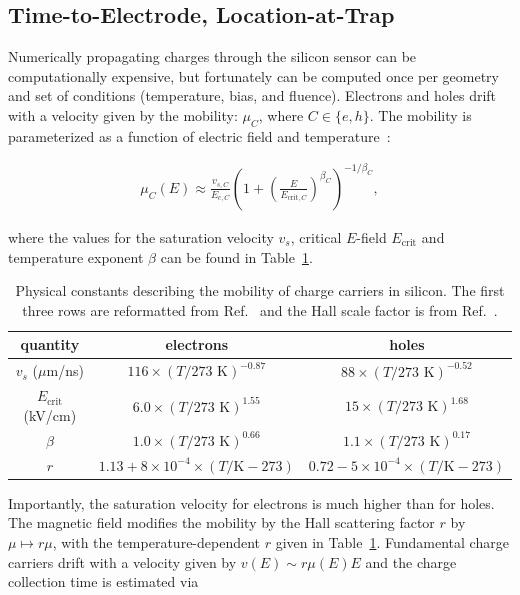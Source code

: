 \subsection{Time-to-Electrode, Location-at-Trap}
\label{sec:maps}

Numerically propagating charges through the silicon sensor can be computationally expensive, but fortunately can be computed once per geometry and set of conditions (temperature, bias, and fluence).   Electrons and holes drift with a velocity given by the mobility: $\mu_C$, where $C\in\{e,h\}$.  The mobility is parameterized as a function of electric field and temperature~\cite{JACOBONI197777}:

\begin{align}
\label{eq:mobility}
\mu_{C}(E)\approx \frac{v_{s,C}}{E_{c,C}}\left(1+\left(\frac{E}{E_{\text{crit},C}}\right)^{\beta_C}\right)^{-1/{\beta_C}},
\end{align}

\noindent where the values for the saturation velocity $v_s$, critical $E$-field $E_\text{crit}$ and temperature exponent $\beta$ can be found in Table~\ref{eq:constants_rad}. 

\begin{table}[!htpb]
\caption{Physical constants describing the mobility of charge carriers in silicon.  The first three rows are reformatted from Ref.~\cite{JACOBONI197777} and the Hall scale factor is from Ref.~\cite{hall1}.}
\label{eq:constants_rad}
\centering
\begin{tabular}{ccc}
  \hline
   quantity & electrons & holes		\\
   \hline	
   \hline
  $v_s$ ($\mu$m/ns) & $116\times (T/273\text{ K})^{-0.87}$ & $88\times (T/273\text{ K})^{-0.52}$ \\
  $E_\text{crit}$ (kV/cm) & $6.0 \times (T/273\text{ K})^{1.55}$ & $15 \times  (T/273\text{ K})^{1.68}$ \\
  $\beta$ & $1.0 \times (T/273\text{ K})^{0.66} $& $1.1\times (T/273\text{ K})^{0.17} $\\
  $r$ &$1.13+8\times 10^{-4}\times (T/\text{K}-273)$ & $0.72-5\times 10^{-4}\times (T/\text{K}-273)$\\
  \hline  
\end{tabular}
\end{table}


 Importantly, the saturation velocity for electrons is much higher than for holes.  The magnetic field modifies the mobility by the Hall scattering factor $r$ by $\mu\mapsto r\mu$, with the temperature-dependent $r$ given in Table~\ref{eq:constants_rad}.  Fundamental charge carriers drift with a velocity given by $v(E)\sim r\mu(E)E$ and the charge collection time is estimated via

